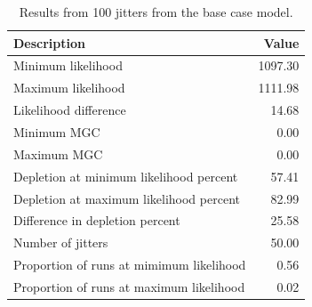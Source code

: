 \documentclass[12pt,]{article}
\begin{document}
\FloatBarrier

\begin{table}[ht]
\centering
\caption{Results from 100 jitters from the base 
                                      case model.} 
\label{tab:jitter}
\begin{tabular}{lr}
  \hline
Description & Value \\ 
  \hline
Minimum likelihood & 1097.30 \\ 
  Maximum likelihood & 1111.98 \\ 
  Likelihood difference & 14.68 \\ 
  Minimum MGC & 0.00 \\ 
  Maximum MGC & 0.00 \\ 
  Depletion at minimum likelihood percent & 57.41 \\ 
  Depletion at maximum likelihood percent & 82.99 \\ 
  Difference in depletion percent & 25.58 \\ 
  Number of jitters & 50.00 \\ 
  Proportion of runs at mimimum likelihood & 0.56 \\ 
  Proportion of runs at maximum likelihood & 0.02 \\ 
   \hline
\end{tabular}
\end{table}
\end{document}
